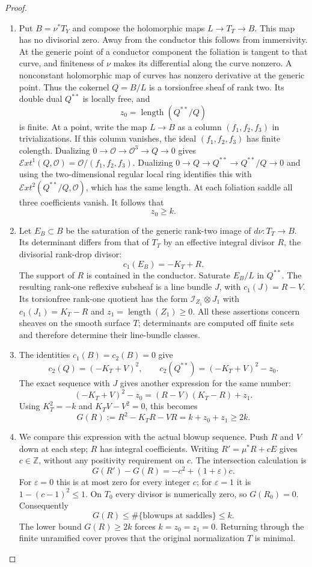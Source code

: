 \begin{proof}
\begin{enumerate}[label={$\langle1\rangle$\arabic*.},leftmargin=*]
\item Put $B=\nu^*T_Y$ and compose the holomorphic
maps $L\to T_T\to B$. This map has no
divisorial zero. Away from the conductor this
follows from immersivity. At the generic point
of a conductor component the foliation is
tangent to that curve, and finiteness of
$\nu$ makes its differential along the curve
nonzero. A nonconstant holomorphic map of
curves has nonzero derivative at the generic
point. Thus the cokernel $Q=B/L$ is a
torsionfree sheaf of rank two. Its double
dual $Q^{**}$ is locally free, and
\[
 z_0=\operatorname{length}(Q^{**}/Q)
\]
is finite. At a point, write the map $L\to B$
as a column $(f_1,f_2,f_3)$ in trivializations.
If this column vanishes, the ideal
$(f_1,f_2,f_3)$ has finite colength. Dualizing
$0\to\mathcal O\to\mathcal O^3\to Q\to0$
gives $\mathcal E xt^1(Q,\mathcal O)
=\mathcal O/(f_1,f_2,f_3)$.
Dualizing $0\to Q\to Q^{**}\to Q^{**}/Q\to0$
and using the two-dimensional regular local
ring identifies this with
$\mathcal E xt^2(Q^{**}/Q,\mathcal O)$,
which has the same length. At each foliation
saddle all three coefficients vanish.
It follows that
\[
 z_0\ge k.
\]

\item Let $E_B\subset B$ be the saturation of the
generic rank-two image of $d\nu:T_T\to B$.
Its determinant differs from that of $T_T$
by an effective integral divisor $R$, the
divisorial rank-drop divisor:
\[
 c_1(E_B)=-K_T+R.
\]
The support of $R$ is contained in the
conductor. Saturate $E_B/L$ in $Q^{**}$.
The resulting rank-one reflexive subsheaf
is a line bundle $J$, with
$c_1(J)=R-V$. Its torsionfree rank-one
quotient has the form
$\mathcal I_{Z_1}\otimes J_1$ with
$c_1(J_1)=K_T-R$ and
$z_1=\operatorname{length}(Z_1)\ge0$.
All these assertions concern sheaves on the
smooth surface $T$; determinants are computed
off finite sets and therefore determine their
line-bundle classes.

\item The identities $c_1(B)=c_2(B)=0$ give
\[
 c_2(Q)=(-K_T+V)^2,\qquad
 c_2(Q^{**})=(-K_T+V)^2-z_0.
\]
The exact sequence with $J$ gives another
expression for the same number:
\[
 (-K_T+V)^2-z_0=(R-V)(K_T-R)+z_1.
\]
Using $K_T^2=-k$ and $K_TV-V^2=0$, this becomes
\[
 G(R):=R^2-K_TR-VR=k+z_0+z_1\ge2k.
\]

\item We compare this expression with the actual
blowup sequence. Push $R$ and $V$ down at
each step; $R$ has integral coefficients.
Writing $R'=\mu^*R+cE$ gives $c\in\mathbb Z$,
without any positivity requirement on $c$.
The intersection calculation is
\[
 G(R')-G(R)=-c^2+(1+\varepsilon)c.
\]
For $\varepsilon=0$ this is at most zero
for every integer $c$; for $\varepsilon=1$
it is $1-(c-1)^2\le1$. On $T_0$ every
divisor is numerically zero, so $G(R_0)=0$.
Consequently
\[
 G(R)\le\#\{\text{blowups at saddles}\}\le k.
\]
The lower bound $G(R)\ge2k$ forces
$k=z_0=z_1=0$. Returning through the finite
unramified cover proves that the original
normalization $T$ is minimal.


\end{enumerate}
\end{proof}
